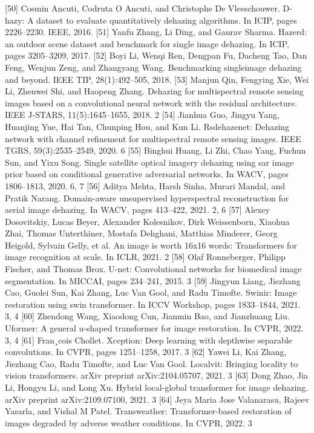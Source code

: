 [50] Cosmin Ancuti, Codruta O Ancuti, and Christophe De Vleeschouwer. D-hazy: A dataset to evaluate quantitatively dehazing algorithms. In ICIP, pages 2226–2230. IEEE, 2016.
[51] Yanfu Zhang, Li Ding, and Gaurav Sharma. Hazerd: an outdoor scene dataset and benchmark for single image dehazing. In ICIP, pages 3205–3209, 2017.
[52] Boyi Li, Wenqi Ren, Dengpan Fu, Dacheng Tao, Dan Feng, Wenjun Zeng, and Zhangyang Wang. Benchmarking singleimage dehazing and beyond. IEEE TIP, 28(1):492–505, 2018.
[53] Manjun Qin, Fengying Xie, Wei Li, Zhenwei Shi, and Haopeng Zhang. Dehazing for multispectral remote sensing images based on a convolutional neural network with the residual architecture. IEEE J-STARS, 11(5):1645–1655, 2018. 2
[54] Jianhua Guo, Jingyu Yang, Huanjing Yue, Hai Tan, Chunping Hou, and Kun Li. Rsdehazenet: Dehazing network with channel refinement for multispectral remote sensing images. IEEE TGRS, 59(3):2535–2549, 2020. 6
[55] Binghui Huang, Li Zhi, Chao Yang, Fuchun Sun, and Yixu Song. Single satellite optical imagery dehazing using sar image prior based on conditional generative adversarial networks. In WACV, pages 1806–1813, 2020. 6, 7
[56] Aditya Mehta, Harsh Sinha, Murari Mandal, and Pratik Narang. Domain-aware unsupervised hyperspectral reconstruction for aerial image dehazing. In WACV, pages 413–422, 2021. 2, 6
[57] Alexey Dosovitskiy, Lucas Beyer, Alexander Kolesnikov, Dirk Weissenborn, Xiaohua Zhai, Thomas Unterthiner, Mostafa Dehghani, Matthias Minderer, Georg Heigold, Sylvain Gelly, et al. An image is worth 16x16 words: Transformers for image recognition at scale. In ICLR, 2021. 2
[58] Olaf Ronneberger, Philipp Fischer, and Thomas Brox. U-net: Convolutional networks for biomedical image segmentation. In MICCAI, pages 234–241, 2015. 3
[59] Jingyun Liang, Jiezhang Cao, Guolei Sun, Kai Zhang, Luc Van Gool, and Radu Timofte. Swinir: Image restoration using swin transformer. In ICCV Workshop, pages 1833–1844, 2021. 3, 4
[60] Zhendong Wang, Xiaodong Cun, Jianmin Bao, and Jianzhuang Liu. Uformer: A general u-shaped transformer for image restoration. In CVPR, 2022. 3, 4
[61] Fran¸cois Chollet. Xception: Deep learning with depthwise separable convolutions. In CVPR, pages 1251–1258, 2017. 3
[62] Yawei Li, Kai Zhang, Jiezhang Cao, Radu Timofte, and Luc Van Gool. Localvit: Bringing locality to vision transformers. arXiv preprint arXiv:2104.05707, 2021. 3
[63] Dong Zhao, Jia Li, Hongyu Li, and Long Xu. Hybrid local-global transformer for image dehazing. arXiv preprint arXiv:2109.07100, 2021. 3
[64] Jeya Maria Jose Valanarasu, Rajeev Yasarla, and Vishal M Patel. Transweather: Transformer-based restoration of images degraded by adverse weather conditions. In CVPR, 2022. 3
